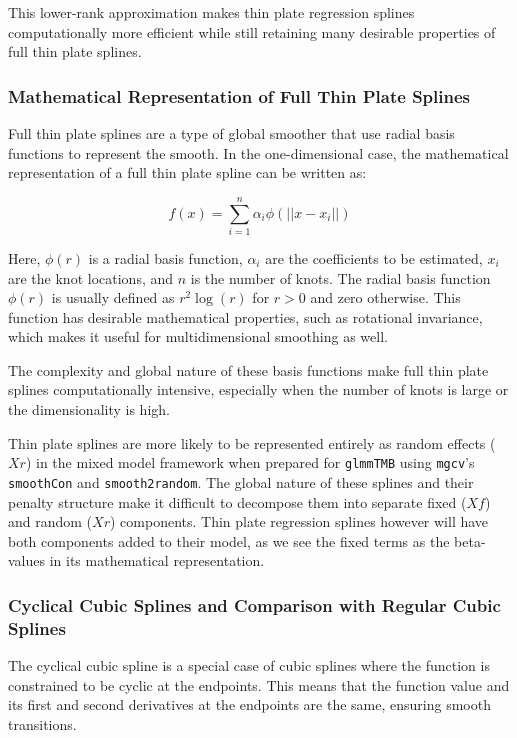 \documentclass[12pt, twoside,hidelinks]{article}
\theoremstyle{definition}
\numberwithin{equation}{section}
\begin{document}
This lower-rank approximation makes thin plate regression splines computationally more efficient while still retaining many desirable properties of full thin plate splines.


\subsubsection*{Mathematical Representation of Full Thin Plate Splines}

Full thin plate splines are a type of global smoother that use radial basis functions to represent the smooth. In the one-dimensional case, the mathematical representation of a full thin plate spline can be written as:

\[
f(x) = \sum_{i=1}^{n} \alpha_i \phi(|| x - x_i ||)
\]

Here, \( \phi(r) \) is a radial basis function, \( \alpha_i \) are the coefficients to be estimated, \( x_i \) are the knot locations, and \( n \) is the number of knots. The radial basis function \( \phi(r) \) is usually defined as \( r^2 \log(r) \) for \( r > 0 \) and zero otherwise. This function has desirable mathematical properties, such as rotational invariance, which makes it useful for multidimensional smoothing as well.

The complexity and global nature of these basis functions make full thin plate splines computationally intensive, especially when the number of knots is large or the dimensionality is high.



Thin plate splines are more likely to be represented entirely as random effects (\(Xr\)) in the mixed model framework when prepared for \texttt{glmmTMB} using \texttt{mgcv}'s \texttt{smoothCon} and \texttt{smooth2random}. The global nature of these splines and their penalty structure make it difficult to decompose them into separate fixed (\(Xf\)) and random (\(Xr\)) components. Thin plate regression splines however will have both components added to their model, as we see the fixed terms as the beta-values in its mathematical representation.


\subsubsection{Cyclical Cubic Splines and Comparison with Regular Cubic Splines}


The cyclical cubic spline is a special case of cubic splines where the function is constrained to be cyclic at the endpoints. This means that the function value and its first and second derivatives at the endpoints are the same, ensuring smooth transitions.
\end{document}
